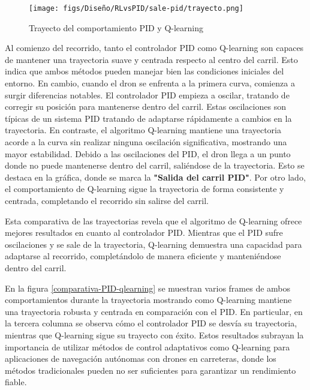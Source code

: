 \begin{figure} [H]
  \begin{center}
    \texttt{[image: figs/Diseño/RLvsPID/sale-pid/trayecto.png]}
  \end{center}
  \caption{Trayecto del comportamiento PID y Q-learning}
  \label{fig:Trayecto-II}
\end{figure}

Al comienzo del recorrido, tanto el controlador PID como Q-learning
son capaces de mantener una trayectoria suave y centrada respecto al centro del carril. Esto indica que ambos métodos pueden manejar bien las condiciones iniciales del entorno. En cambio, cuando 
el dron se enfrenta a la primera curva, comienza a surgir diferencias notables. El controlador PID empieza a oscilar, tratando de corregir su posición para mantenerse dentro del carril. Estas 
oscilaciones son típicas de un sistema PID tratando de adaptarse rápidamente a cambios en la trayectoria. En contraste, el algoritmo Q-learning mantiene una trayectoria acorde a la curva 
sin realizar ninguna oscilación significativa, mostrando una mayor estabilidad. Debido a las oscilaciones del PID, el dron llega a un punto donde no puede mantenerse dentro del carril, saliéndose 
de la trayectoria. Esto se destaca en la gráfica, donde se marca la \textbf{"Salida del carril PID"}. Por otro lado, el comportamiento de Q-learning sigue la trayectoria  de forma consistente 
y centrada, completando el recorrido sin salirse del carril. \newline

Esta comparativa de las trayectorias revela que el algoritmo de Q-learning ofrece mejores resultados en cuanto al controlador PID. Mientras que el PID sufre oscilaciones y se sale de la trayectoria,
Q-learning demuestra una capacidad para adaptarse al recorrido, completándolo de manera eficiente y manteniéndose dentro del carril.



En la figura \ref{comparativa-PID-qlearning} se muestran varios frames de ambos comportamientos durante la trayectoria mostrando como Q-learning mantiene una trayectoria robusta y centrada 
en comparación con el PID. En particular, en la tercera columna se observa cómo el controlador PID se desvía su trayectoria, mientras que Q-learning sigue su trayecto con éxito. 
Estos resultados subrayan la importancia de utilizar métodos de control adaptativos como Q-learning para aplicaciones de navegación autónomas con drones en carreteras, donde los métodos 
tradicionales pueden no ser suficientes para garantizar un rendimiento fiable. 

